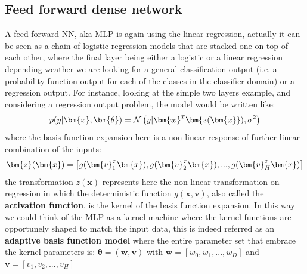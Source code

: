 
\subsection{Feed forward dense network}
%
A feed forward NN, aka \ac{MLP} is again using the linear regression, actually it can be seen as a chain of logistic regression models that are stacked one on top of each other, where the final layer being either a logistic or a linear regression depending weather we are looking for a general classification output (i.e. a probability function output for each of the classes in the classifier domain) or a regression output. 
For instance, looking at the simple two layers example, and considering a regression output problem, the model would be written like:
\begin{equation}
    p(y|\bm{x},\bm{\theta}) = \mathcal{N}\left(y|\transpose{\bm{w}}\bm{z(\bm{x}}), \sigma^2 \right)
\end{equation}
where the basis function expansion here is a non-linear response of further linear combination of the inputs:
\begin{equation}
    \bm{z}(\bm{x}) = \left[ g(\transpose{\bm{v}_1}\bm{x}), g(\transpose{\bm{v}_2}\bm{x}), ..., g(\transpose{\bm{v}_H}\bm{x}) \right]
\end{equation}
the transformation $z(\bm{x})$ represents here the non-linear transformation on regression in which the deterministic function $g(\bm{x},\bm{v})$, also called the \textbf{activation function}, is the kernel of the basis function expansion. In this way we could think of the MLP as a kernel machine where the kernel functions are opportunely shaped to match the input data, this is indeed referred as an \textbf{adaptive basis function model} where the entire parameter set that embrace the kernel parameters is: $\bm{\theta} = (\bm{w}, \bm{v})$ with $\bm{w} = [w_0, w_1, ..., w_D]$ and $\bm{v} = [v_1, v_2, ..., v_H]$


